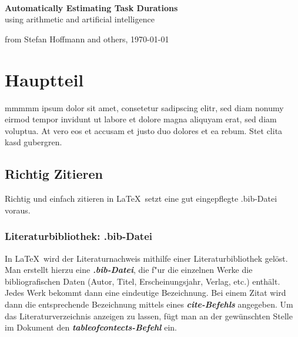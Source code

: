 \documentclass[12pt,a4paper]{article}
\begin{document}
\thispagestyle{empty}
\vspace*{-3cm}
\begin{center}
\large \textsc{}
\vspace{0.5cm}
\vspace{5.5cm}
{\Large \textsc{\\
}}\\
{\large}\\
\vspace{1cm}
{\Large \bf
Automatically Estimating Task Durations}\\
\vspace*{1cm}
{\large using arithmetic and artificial intelligence}
\end{center}
\vspace*{14cm}


\hspace*{\fill} from Stefan Hoffmann and others, \today

\newpage
{}
\tableofcontents



\newpage
{}



\newpage
\section{Hauptteil}\label{body}
mmmmm ipsum dolor sit amet, consetetur sadipscing elitr, sed diam nonumy eirmod tempor invidunt ut labore et dolore magna aliquyam erat, sed diam voluptua. At vero eos et accusam et justo duo dolores et ea rebum. Stet clita kasd gubergren.

\subsection{Richtig Zitieren}
Richtig und einfach zitieren in \LaTeX\ setzt eine gut eingepflegte  .bib-Datei voraus.
\subsubsection {Literaturbibliothek: .bib-Datei }
In \LaTeX\ wird der Literaturnachweis mithilfe einer Literaturbibliothek gelöst. Man erstellt hierzu eine \textbf{\emph{.bib-Datei}}, die f"ur die einzelnen Werke die bibliografischen Daten (Autor, Titel, Erscheinungsjahr, Verlag, etc.) enthält. Jedes Werk bekommt dann eine eindeutige Bezeichnung. Bei einem Zitat wird dann die entsprechende Bezeichnung mittels eines \textbf{\emph{cite-Befehls}} angegeben. Um das Literaturverzeichnis anzeigen zu lassen, fügt man an der gewünschten Stelle im Dokument den \textbf{\emph{tableofcontects-Befehl}} ein.
\end{document}
